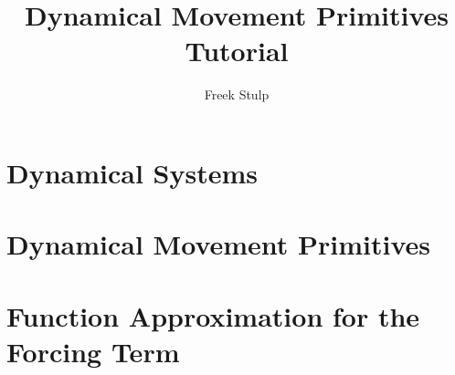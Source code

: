 \documentclass[a4paper,11pt]{book}
\author{Freek Stulp}
\title{Dynamical Movement Primitives Tutorial}
\begin{document}
\maketitle


\setcounter{tocdepth}{2}
\tableofcontents

\newpage



%
%

\chapter{Dynamical Systems}


\chapter{Dynamical Movement Primitives}



\chapter{Function Approximation for the Forcing Term}


\end{document}
